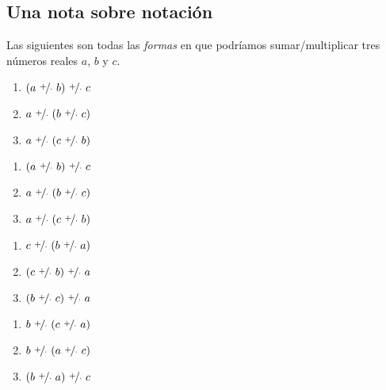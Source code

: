 \documentclass[11pt]{article}
\begin{document}
\subsection*{Una nota sobre notación}

Las siguientes son todas las \textit{formas} en que podríamos sumar/multiplicar tres números reales $a$, $b$ y $c$.
\begin{center}
 \begin{minipage}[c]{.2\linewidth}
  \begin{enumerate}[label=\roman*.]
   \item $(a \ \nicefrac{+}{\cdot} \ b) \ \nicefrac{+}{\cdot} \ c$
   \item $a \ \nicefrac{+}{\cdot} \ (b \ \nicefrac{+}{\cdot} \ c)$
   \item $a \ \nicefrac{+}{\cdot} \ (c \ \nicefrac{+}{\cdot} \ b)$
  \end{enumerate}
  \end{minipage}%
  \begin{minipage}[c]{.2\linewidth}
   \begin{enumerate}[start=4,label=\roman*.]
    \item $(a \ \nicefrac{+}{\cdot} \ b) \ \nicefrac{+}{\cdot} \ c$
    \item $a \ \nicefrac{+}{\cdot} \ (b \ \nicefrac{+}{\cdot} \ c)$
    \item $a \ \nicefrac{+}{\cdot} \ (c \ \nicefrac{+}{\cdot} \ b)$
   \end{enumerate}
   \end{minipage}%
  \begin{minipage}[c]{.2\linewidth}
   \begin{enumerate}[start=7,label=\roman*.]
   \item $c \ \nicefrac{+}{\cdot} \ (b \ \nicefrac{+}{\cdot} \ a)$
   \item $(c \ \nicefrac{+}{\cdot} \ b) \ \nicefrac{+}{\cdot} \ a$
   \item $(b \ \nicefrac{+}{\cdot} \ c) \ \nicefrac{+}{\cdot} \ a$
  \end{enumerate}
  \end{minipage}
  \begin{minipage}[c]{.2\linewidth}
   \begin{enumerate}[start=10,label=\roman*.]
   \item $b \ \nicefrac{+}{\cdot} \ (c \ \nicefrac{+}{\cdot} \ a)$
   \item $b \ \nicefrac{+}{\cdot} \ (a \ \nicefrac{+}{\cdot} \ c)$
   \item $(b \ \nicefrac{+}{\cdot} \ a) \ \nicefrac{+}{\cdot} \ c$
  \end{enumerate}
  \end{minipage}
\end{center}
\end{document}
